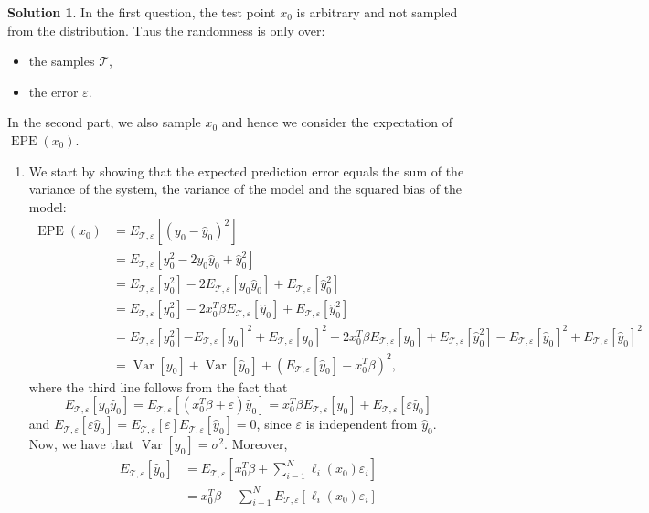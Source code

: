 \documentclass[]{book}
\theoremstyle{definition}
\newtheorem*{soln}{Solution}
\newcommand{\TT}{\mathcal{T}} \newcommand{\WW}{\mathbf{W}}
\DeclareMathOperator*{\EPE}{EPE} \DeclareMathOperator*{\Var}{Var}
\begin{document}
\begin{enumerate}
	\begin{soln}
		{ \newcommand{\Exp}{E_{\TT,\varepsilon}} In the first question, the test
			point $x_0$ is arbitrary and not sampled from the distribution. Thus
			the randomness is only over:
			\begin{itemize}
				\item the samples $\TT$,
				\item the error $\varepsilon$.
			\end{itemize}
			In the second part, we also sample $x_0$ and hence we consider the
			expectation of $\EPE(x_0)$.
			\begin{enumerate}
				\item We start by showing that the expected prediction error
				      equals the sum of the variance of the system, the variance
				      of the model and the squared bias of the model:
				      \begin{equation*}
					      \begin{split}
						      \EPE(x_0) &= \Exp[(y_0-\hat y_0)^2] \\
						      &= \Exp[y_0^2-2y_0\hat y_0 + \hat y_0^2] \\
						      &= \Exp[y_0^2]-2\Exp[y_0\hat y_0] + \Exp[\hat y_0^2] \\
						      &= \Exp[y_0^2]-2x_0^T\beta\Exp[\hat y_0] + \Exp[\hat y_0^2] \\
						      &= \Exp[y_0^2]\boxed{-\Exp[y_0]^2+\Exp[y_0]^2}-2x_0^T\beta\Exp[\hat y_0] + \Exp[\hat y_0^2] - \boxed{\Exp[\hat y_0]^2 + \Exp[\hat y_0]^2} \\
						      &= \Var[y_0] + \Var[\hat y_0] + \left(\Exp[\hat y_0]-x_0^T\beta\right)^2,
					      \end{split}
				      \end{equation*}
				      where the third line follows from the fact that
				      \[\Exp[y_0\hat y_0]=\Exp[(x_0^T\beta+\varepsilon)\hat
						      y_0]=x_0^T\beta\Exp[\hat y_0]+\Exp[\varepsilon\hat
						      y_0]\] and $\Exp[\varepsilon\hat
						      y_0]=\Exp[\varepsilon]\Exp[\hat y_0]=0$, since
				      $\varepsilon$ is independent from $\hat y_0$. Now,
				      we have that $\Var[y_0]=\sigma^2$. Moreover,
				      \begin{equation}
					      \begin{split}
						      \Exp[\hat y_0] &= \Exp\left[x_0^T\beta + \sum_{i-1}^N\ell_i(x_0)\varepsilon_i\right] \\
						      &= x_0^T\beta + \sum_{i-1}^N\Exp[\ell_i(x_0)\varepsilon_i] \\

\end{split}
\end{equation}
\end{enumerate}}
\end{soln}
\end{enumerate}
\end{document}
